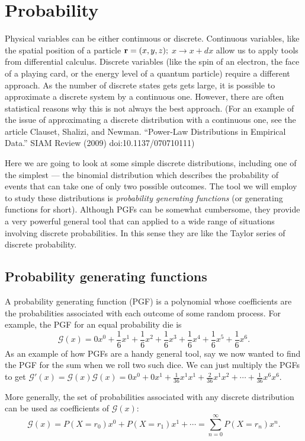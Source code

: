\documentclass{article}
\newcommand{\calG}{\mathcal{G}}
\begin{document}
\section{Probability}
Physical variables can be either continuous or discrete. Continuous variables, like the spatial position of a particle ${\bf r} = (x,y,z);$ $x\rightarrow x+dx$ allow us to apply tools from differential calculus. Discrete variables (like the spin of an electron, the face of a playing card, or the energy level of a quantum particle) require a different approach. As the number of discrete states gets gets large, it is possible to approximate a discrete system by a continuous one. However, there are often statistical reasons why this is not always the best approach. (For an example of the issue of approximating a discrete distribution with a continuous one, see the article  Clauset, Shalizi, and Newman. ``Power-Law Distributions in Empirical Data.'' SIAM Review (2009) doi:10.1137/070710111)

Here we are going to look at some simple discrete distributions, including one of the simplest --- the binomial distribution which describes the probability of events that can take one of only two possible outcomes. The tool we will employ to study these distributions is \emph{probability generating functions} (or generating functions for short). Although PGFs can be somewhat cumbersome, they provide a very powerful general tool that can applied to a wide range of situations involving discrete probabilities. In this sense they are like the Taylor series of discrete probability.

\subsection{Probability generating functions}
A probability generating function (PGF) is a polynomial whose coefficients are the probabilities associated with each outcome of some random process.
For example, the PGF for an equal probability die is 
$$\calG(x) = 0x^0+\frac16x^1+\frac16x^2+\frac16x^3+\frac16x^4+\frac16x^5+\frac16x^6.$$
As an example of how PGFs are a handy general tool, say we now wanted to find the PGF for the sum when we roll two such dice. We can just multiply the PGFs to get $\calG'(x) = \calG(x)\calG(x) = 0x^0 + 0x^1+\frac{1}{36}x^1x^1+\frac{2}{36}x^1x^2+\cdots+\frac{1}{36}x^6x^6.$

More generally, the set of probabilities associated with any discrete distribution can be used as coefficients of $\calG(x)$:
$$\calG(x) = P(X=r_0)x^0+P(X=r_1)x^1+\cdots = \sum_{n=0}^\infty P(X=r_n)x^n.$$
\end{document}
